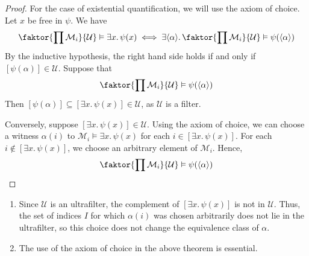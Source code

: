 \begin{proof}
    For the case of existential quantification, we will use the axiom of choice.
    Let \( x \) be free in \( \psi \).
    We have
    \[ \faktor{\prod \mathcal M_i}{\mathcal U} \vDash \exists x.\, \psi(x) \iff \exists \langle \alpha \rangle.\, \faktor{\prod \mathcal M_i}{\mathcal U} \vDash \psi(\langle \alpha \rangle) \]
    By the inductive hypothesis, the right hand side holds if and only if \( [\psi(\alpha)] \in \mathcal U \).
    Suppose that
    \[ \faktor{\prod \mathcal M_i}{\mathcal U} \vDash \psi(\langle \alpha \rangle) \]
    Then \( [\psi(\alpha)] \subseteq [\exists x.\, \psi(x)] \in \mathcal U \), as \( \mathcal U \) is a filter.
    
    Conversely, suppose \( [\exists x.\, \psi(x)] \in \mathcal U \).
    Using the axiom of choice, we can choose a witness \( \alpha(i) \) to \( \mathcal M_i \vDash \exists x.\, \psi(x) \) for each \( i \in [\exists x.\, \psi(x)] \).
    For each \( i \notin [\exists x.\, \psi(x)] \), we choose an arbitrary element of \( \mathcal M_i \).
    Hence,
    \[ \faktor{\prod \mathcal M_i}{\mathcal U} \vDash \psi(\langle \alpha \rangle) \]
\end{proof}
\begin{remark}
    \begin{enumerate}
        \item Since \( \mathcal U \) is an ultrafilter, the complement of \( [\exists x.\, \psi(x)] \) is not in \( \mathcal U \).
        Thus, the set of indices \( I \) for which \( \alpha(i) \) was chosen arbitrarily does not lie in the ultrafilter, so this choice does not change the equivalence class of \( \alpha \).
        \item The use of the axiom of choice in the above theorem is essential.
    \end{enumerate}
\end{remark}
